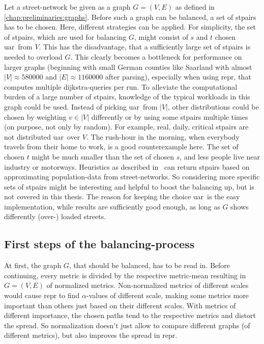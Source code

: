         Let a street-network be given as a graph $G = (V, E)$ as defined in \cref{chap:preliminaries:graphs}.
        Before such a graph can be balanced, a set of \glspl{stpair} has to be chosen.
        Here, different strategies can be applied.
        For simplicity, the set of \glspl{stpair}, which are used for balancing $G$, might consist of $s$ and $t$ chosen \gls{uar}\ from $V$.
        This has the disadvantage, that a sufficiently large set of \glspl{stpair} is needed to overload $G$.
        This clearly becomes a bottleneck for performance on larger graphs (beginning with small German counties like Saarland with almost $|V| \approx \num{580000}$ and $|E| \approx \num{1160000}$ after parsing), especially when using \gls{repr}, that computes multiple \gls{dijkstra}-queries per run.
        To alleviate the computational burden of a large number of \glspl{stpair}, knowledge of the typical workloads in this graph could be used.
        Instead of picking \gls{uar}\ from $|V|$, other distributions could be chosen by weighting $v \in |V|$ differently or by using some \glspl{stpair} multiple times (on purpose, not only by random).
        For example, real, daily, critical \glspl{stpair} are not distributed \gls{uar}\ over $V$.
        The rush-hour in the morning, when everybody travels from their home to work, is a good counterexample here.
        The set of chosen $t$ might be much smaller than the set of chosen $s$, and less people live near industry or motorways.
        Heuristics as described in~\cite{bakillah:population_from_osm} can return \glspl{stpair} based on approximating population-data from street-networks.
        So considering more specific sets of \glspl{stpair} might be interesting and helpful to boost the \gls{balancing} up, but is not covered in this thesis.
        The reason for keeping the choice \gls{uar}\ is the easy implementation, while results are sufficiently good enough, as long as $G$ shows differently (over-) loaded streets.

    \subsection{First steps of the balancing-process}

        At first, the graph $G$, that should be balanced, has to be read in.
        Before continuing, every \gls{metric} is divided by the respective \gls{metric}-mean resulting in $G = (V, E)$ of normalized \glspl{metric}.
        Non-normalized \glspl{metric} of different scales would cause \gls{repr} to find $\alpha$-values of different scale, making some \glspl{metric} more important than others just based on their different scales.
        With \glspl{metric} of different importance, the chosen paths tend to the respective \glspl{metric} and distort the spread.
        So normalization doesn't just allow to compare different graphs (of different \glspl{metric}), but also improves the spread in \gls{repr}.

